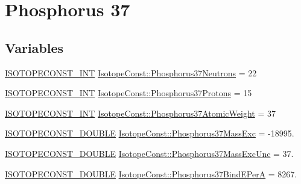 \hypertarget{group___isotope_const-_phosphorus-_p37}{}\section{Phosphorus 37}
\label{group___isotope_const-_phosphorus-_p37}
\subsection*{Variables}
\begin{DoxyCompactItemize}
\item 
\mbox{\hyperlink{group___isotope_const-_macros_ga5f18360b3e99483a35c32d789e62621c}{I\+S\+O\+T\+O\+P\+E\+C\+O\+N\+S\+T\+\_\+\+I\+NT}} \mbox{\hyperlink{group___isotope_const-_phosphorus-_p37_ga37a0356e1a791518f86b4ab11ba81157}{Isotope\+Const\+::\+Phosphorus37\+Neutrons}} = 22
\item 
\mbox{\hyperlink{group___isotope_const-_macros_ga5f18360b3e99483a35c32d789e62621c}{I\+S\+O\+T\+O\+P\+E\+C\+O\+N\+S\+T\+\_\+\+I\+NT}} \mbox{\hyperlink{group___isotope_const-_phosphorus-_p37_ga5bf399d994aad613423c36329c9fce29}{Isotope\+Const\+::\+Phosphorus37\+Protons}} = 15
\item 
\mbox{\hyperlink{group___isotope_const-_macros_ga5f18360b3e99483a35c32d789e62621c}{I\+S\+O\+T\+O\+P\+E\+C\+O\+N\+S\+T\+\_\+\+I\+NT}} \mbox{\hyperlink{group___isotope_const-_phosphorus-_p37_gaa149aaa051ea70c2ee5880a5201b870a}{Isotope\+Const\+::\+Phosphorus37\+Atomic\+Weight}} = 37
\item 
\mbox{\hyperlink{group___isotope_const-_macros_ga8f45a7272ce02c0b4c65c44636ed719a}{I\+S\+O\+T\+O\+P\+E\+C\+O\+N\+S\+T\+\_\+\+D\+O\+U\+B\+LE}} \mbox{\hyperlink{group___isotope_const-_phosphorus-_p37_ga1458aec504127a2ef1731cb1f4a8105f}{Isotope\+Const\+::\+Phosphorus37\+Mass\+Exc}} = -\/18995.
\item 
\mbox{\hyperlink{group___isotope_const-_macros_ga8f45a7272ce02c0b4c65c44636ed719a}{I\+S\+O\+T\+O\+P\+E\+C\+O\+N\+S\+T\+\_\+\+D\+O\+U\+B\+LE}} \mbox{\hyperlink{group___isotope_const-_phosphorus-_p37_ga6e89e665c4e6429e07988951e004cef6}{Isotope\+Const\+::\+Phosphorus37\+Mass\+Exc\+Unc}} = 37.
\item 
\mbox{\hyperlink{group___isotope_const-_macros_ga8f45a7272ce02c0b4c65c44636ed719a}{I\+S\+O\+T\+O\+P\+E\+C\+O\+N\+S\+T\+\_\+\+D\+O\+U\+B\+LE}} \mbox{\hyperlink{group___isotope_const-_phosphorus-_p37_ga6483f54d042c8cd16d744396c415a073}{Isotope\+Const\+::\+Phosphorus37\+Bind\+E\+PerA}} = 8267.
\item 

\end{DoxyCompactItemize}
